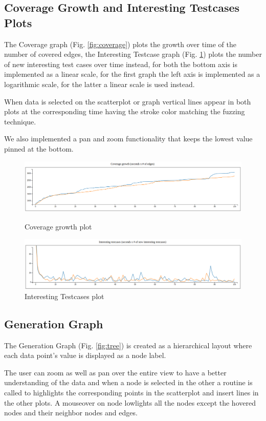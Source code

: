 \documentclass[conference,compsoc]{IEEEtran}
\begin{document}
\subsection{Coverage Growth and Interesting Testcases Plots}

The Coverage graph (Fig. \ref{fig:coverage}) plots the growth over time of the number of covered edges, the Interesting Testcase graph (Fig. \ref{fig:inputs}) plots the number of new interesting test cases over time instead, for both the bottom axis is implemented as a linear scale, for the first graph the left axis is implemented as a logarithmic scale, for the latter a linear scale is used instead.\par
When data is selected on the scatterplot or graph vertical lines appear in both plots at the corresponding time having the stroke color matching the fuzzing technique.\par
We also implemented a pan and zoom functionality that keeps the lowest value pinned at the bottom.

\begin{figure}[h]
  \includegraphics[scale=0.25]{img/coverage}
  \centering
  \caption{Coverage growth plot}
  \label{fig:coverage}
  \includegraphics[scale=0.25]{img/inputs}
  \centering
  \caption{Interesting Testcases plot}
  \label{fig:inputs}
\end{figure}

\subsection{Generation Graph}
The Generation Graph (Fig. \ref{fig:tree})  is created as a hierarchical layout where each data point's value is displayed as a node label.\par
The user can zoom as well as pan over the entire view to have a better understanding of the data and when a node is selected in the other a routine is called to highlights the corresponding points in the scatterplot and insert lines in the other plots.
A mouseover on node lowlights all the nodes except the hovered nodes and their neighbor nodes and edges.
\end{document}
